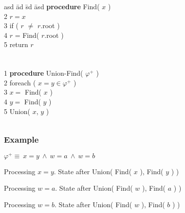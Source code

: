 \begin{frame}[fragile]
\begin{columns}
  \begin{column}{.35\textwidth}
    \pause
    \begin{tabbing}
      asd \= ad \= sd \= asd  \> {\bf procedure} Find( $x$ ) \\
      2 \> $r = x$ \\
      3 \> if ( $r$ $\not=$ $r$.root ) \\
      4 \> \> $r$ = Find( $r$.root ) \\
      5 \> return $r$ \\
      \\
      \pause\\
      1 \> {\bf procedure} Union-Find( $\varphi^+$ ) \\
      2 \> foreach ( $x=y \in \varphi^+$ ) \\  
      3 \> \> $x =$ Find( $x$ ) \\
      4 \> \> $y =$ Find( $y$ ) \\
      5 \> \> Union( $x$, $y$ )
    \end{tabbing}
  \end{column}

  \end{columns}

\end{frame}

\begin{frame}
  \frametitle{Example}

  \scriptsize

  $\varphi^+ \equiv\ x\!=\!y\ \wedge\ w\!=\!a\ \wedge\ w\!=\!b$
  \vfill
  \begin{center}
  
  \vfill\pause
  Processing $x=y$. State after Union( Find( $x$ ), Find( $y$ ) ) 
  
  \vfill\pause
  Processing $w=a$. State after Union( Find( $w$ ), Find( $a$ ) ) 
  
  \vfill\pause
  Processing $w=b$. State after Union( Find( $w$ ), Find( $b$ ) ) 
  
  \end{center}

\end{frame}

